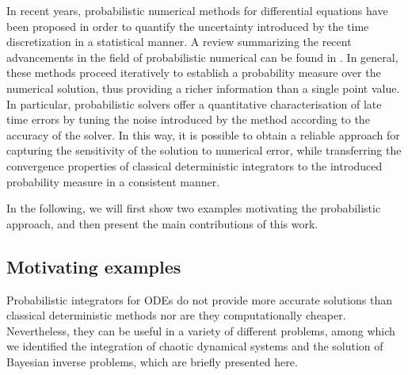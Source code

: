 \documentclass[10pt]{article}
\begin{document}
In recent years, probabilistic numerical methods for differential equations have been proposed \cite{CGS17, CCC16, SDH14} in order to quantify the uncertainty introduced by the time discretization in a statistical manner. A review summarizing the recent advancements in the field of probabilistic numerical can be found in \cite{OaS19, COS19}. In general, these methods proceed iteratively to establish a probability measure over the numerical solution, thus providing a richer information than a single point value. In particular, probabilistic solvers offer a quantitative characterisation of late time errors by tuning the noise introduced by the method according to the accuracy of the solver. In this way, it is possible to obtain a reliable approach for capturing the sensitivity of the solution to numerical error, while transferring the convergence properties of classical deterministic integrators to the introduced probability measure in a consistent manner. 

In the following, we will first show two examples motivating the probabilistic approach, and then present the main contributions of this work.

\subsection{Motivating examples} Probabilistic integrators for ODEs do not provide more accurate solutions than classical deterministic methods nor are they computationally cheaper. Nevertheless, they can be useful in a variety of different problems, among which we identified the integration of chaotic dynamical systems and the solution of Bayesian inverse problems, which are briefly presented here.
\end{document}
